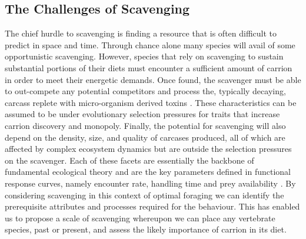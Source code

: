 \documentclass[a4paper,12pt]{article}
\begin{document}
\subsection*{The Challenges of Scavenging} 
The chief hurdle to scavenging is finding a resource that is often difficult to predict in space and time.
Through chance alone many species will avail of some opportunistic scavenging. 
However, species that rely on scavenging to sustain substantial portions of their diets must encounter a sufficient amount of carrion in order to meet their energetic demands.
Once found, the scavenger must be able to out-compete any potential competitors and process the, typically decaying, carcass replete with micro-organism derived toxins  \citep{ruxton2014fruit}. 
These characteristics can be assumed to be under evolutionary selection pressures for traits that increase carrion discovery and monopoly.
Finally, the potential for scavenging will also depend on the density, size, and quality of carcases produced, all of which are affected by complex ecosystem dynamics but are outside the selection pressures on the scavenger.
Each of these facets are essentially the backbone of fundamental ecological theory and are the key parameters defined in functional response curves, namely encounter rate, handling time and prey availability \citep{jeschke2002predator}.  
By considering scavenging in this context of optimal foraging we can identify the prerequisite attributes and processes required for the behaviour. 
This has enabled us to propose a scale of scavenging whereupon we can place any vertebrate species, past or present, and assess the likely importance of carrion in its diet. 
\end{document}

